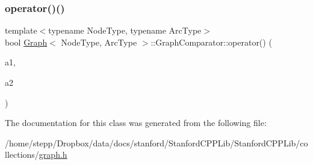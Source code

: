 \mbox{\label{classGraph_1_1GraphComparator_a28620cbf8e7ac3f3a2d623a2158c1898}} 
\subsubsection{\texorpdfstring{operator()()}{operator()()}\hspace{0.1cm}{\footnotesize\ttfamily [2/2]}}
{\footnotesize\ttfamily template$<$typename Node\+Type, typename Arc\+Type$>$ \\
bool \mbox{\hyperlink{classGraph}{Graph}}$<$ Node\+Type, Arc\+Type $>$\+::Graph\+Comparator\+::operator() (\begin{DoxyParamCaption}\item[{Arc\+Type $\ast$}]{a1,  }\item[{Arc\+Type $\ast$}]{a2 }\end{DoxyParamCaption})\hspace{0.3cm}{\ttfamily [inline]}}



The documentation for this class was generated from the following file\+:\begin{DoxyCompactItemize}
\item 
/home/stepp/\+Dropbox/data/docs/stanford/\+Stanford\+C\+P\+P\+Lib/\+Stanford\+C\+P\+P\+Lib/collections/\mbox{\hyperlink{graph_8h}{graph.\+h}}\end{DoxyCompactItemize}
